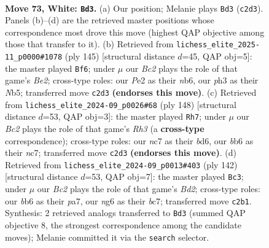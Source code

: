 \documentclass[11pt]{article}
\begin{document}
\clearpage

\begin{figure}[p]\centering
\begin{subfigure}{0.46\textwidth}\centering
\resizebox{\linewidth}{!}{%
\newchessgame
\chessboard[
  setfen={8/2n5/1b1N2nk/p7/P2pP3/1P5p/1KB1P3/8 w - - 12 73},
  showmover=false,
  pgfstyle=straightmove, color=movearrow, markmove={c2-d3}
]}
\caption{}
\end{subfigure}\hfill
\begin{subfigure}{0.46\textwidth}\centering
\resizebox{\linewidth}{!}{%
\newchessgame
\chessboard[
  setfen={4k3/4b3/1N2p3/1n1bN1pp/4p3/6PP/1B3P2/6K1 b - - 11 73},
  showmover=false,
  pgfstyle=straightmove, color=movearrow, markmove={e7-f6}
]}
\caption{}
\end{subfigure}
\\[4pt]
\begin{subfigure}{0.46\textwidth}\centering
\resizebox{\linewidth}{!}{%
\newchessgame
\chessboard[
  setfen={8/2n1k1p1/3b2P1/1p3KP1/1P6/2P4R/8/8 w - - 19 75},
  showmover=false,
  pgfstyle=straightmove, color=movearrow, markmove={h3-h7}
]}
\caption{}
\end{subfigure}\hfill
\begin{subfigure}{0.46\textwidth}\centering
\resizebox{\linewidth}{!}{%
\newchessgame
\chessboard[
  setfen={3n4/p1bk4/1p6/2p3N1/P1P5/1P1K4/3B4/8 w - - 7 72},
  showmover=false,
  pgfstyle=straightmove, color=movearrow, markmove={d2-c3}
]}
\caption{}
\end{subfigure}
\caption{\textbf{Move 73, White: \texttt{Bd3}.} (a) Our position; Melanie plays \texttt{Bd3} (\texttt{c2d3}). Panels (b)--(d) are the retrieved master positions whose correspondence most drove this move (highest QAP objective among those that transfer to it). (b) Retrieved from \texttt{lichess\_elite\_2025-11\_p0000\#1078} (ply 145) [structural distance $d$=45, QAP obj=5]: the master played \texttt{Bf6}; under $\mu$ our \emph{Bc2} plays the role of that game's \emph{Be2}; cross-type roles: our \emph{P}e2 as their \emph{n}b6, our \emph{p}h3 as their \emph{N}b5; transferred move \texttt{c2d3} \textbf{(endorses this move)}. (c) Retrieved from \texttt{lichess\_elite\_2024-09\_p0026\#68} (ply 148) [structural distance $d$=53, QAP obj=3]: the master played \texttt{Rh7}; under $\mu$ our \emph{Bc2} plays the role of that game's \emph{Rh3} (a \textbf{cross-type} correspondence); cross-type roles: our \emph{n}c7 as their \emph{b}d6, our \emph{b}b6 as their \emph{n}c7; transferred move \texttt{c2d3} \textbf{(endorses this move)}. (d) Retrieved from \texttt{lichess\_elite\_2024-09\_p0013\#403} (ply 142) [structural distance $d$=53, QAP obj=7]: the master played \texttt{Bc3}; under $\mu$ our \emph{Bc2} plays the role of that game's \emph{Bd2}; cross-type roles: our \emph{b}b6 as their \emph{p}a7, our \emph{n}g6 as their \emph{b}c7; transferred move \texttt{c2b1}. Synthesis: 2 retrieved analogs transferred to \texttt{Bd3} (summed QAP objective 8, the strongest correspondence among the candidate moves); Melanie committed it via the \texttt{search} selector.}
\label{fig:thought-m144}
\end{figure}
\end{document}

